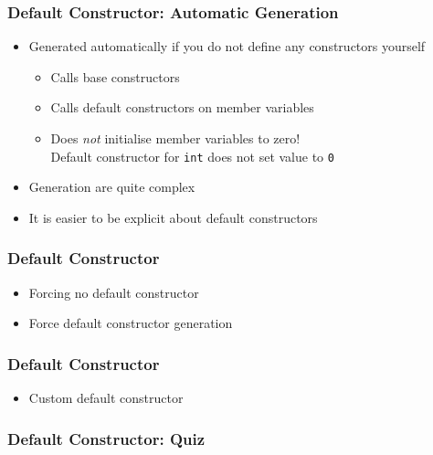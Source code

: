 \begin{frame}
  \frametitle{Default Constructor: Automatic Generation}
  \begin{itemize}
    \item Generated automatically if you do not define any constructors yourself
          \begin{itemize}
            \item Calls base constructors
            \item Calls default constructors on member variables
            \item Does \emph{not} initialise member variables to zero! \\ Default constructor for {\tt int} does not set value to {\tt 0}
          \end{itemize}
    \item Generation  are quite complex
    \item It is easier to be explicit about default constructors
  \end{itemize}
\end{frame}

\begin{frame}
  \frametitle{Default Constructor}
  \begin{itemize}
    \item Forcing no default constructor
          \vskip1mm
    \item Force default constructor generation
          \vskip1mm
  \end{itemize}
\end{frame}

\begin{frame}
  \frametitle{Default Constructor}
  \begin{itemize}
    \item Custom default constructor
          \vskip1mm
  \end{itemize}
\end{frame}

\begin{frame}
  \frametitle{Default Constructor: Quiz}
\end{frame}

